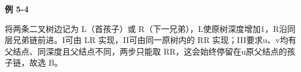{\color{ink}\bfseries 例 5-4}\par\vspace{1bp}将两条二叉树边记为 L（首孩子）或 R（下一兄弟），L使原树深度增加1，R沿同层兄弟链前进。I可由 LR 实现，II可由同一原树内的 RR 实现；III要求u、v均有父结点、同深度且父结点不同，两步只能取 RR，这会始终停留在u原父结点的孩子链，故选 B。
